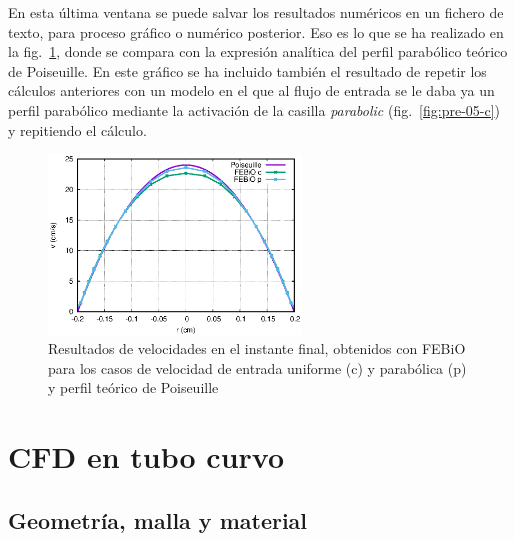 En esta última ventana se puede salvar los resultados numéricos en un fichero de texto, para proceso gráfico o numérico posterior.
Eso es lo que se ha realizado en la fig.~\ref{fig:pois-vr_comp}, donde se compara con la expresión analítica del perfil parabólico teórico de Poiseuille.
En este gráfico se ha incluido también el resultado de repetir los cálculos anteriores con un modelo en el que al flujo de entrada se le daba ya un perfil parabólico mediante la activación de la casilla \emph{parabolic} (fig.~\ref{fig:pre-05-c}) y repitiendo el cálculo.
\begin{figure}[!htp]
\centering
\includegraphics[width=0.6\textwidth]{figuras_4/pois-vr_comp.eps}
\caption{Resultados de velocidades en el instante final, obtenidos con FEBiO para los casos de velocidad de entrada uniforme (c) y parabólica (p) y perfil teórico de Poiseuille}
\label{fig:pois-vr_comp}
\end{figure}

\clearpage
\section{CFD en tubo curvo}
\label{sec:tubocurvo}

\subsection{Geometría, malla y material}

